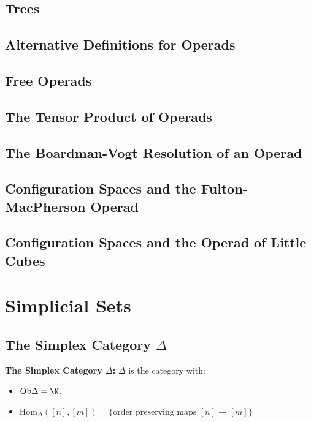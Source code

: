 \subsection{Trees}

\subsection{Alternative Definitions for Operads}

\subsection{Free Operads}

\subsection{The Tensor Product of Operads}

\subsection{The Boardman-Vogt Resolution of an Operad}

\subsection{Configuration Spaces and the Fulton-MacPherson Operad}

\subsection{Configuration Spaces and the Operad of Little Cubes}

\section{Simplicial Sets}
\subsection{The Simplex Category $\Delta$}
\begin{definition}
    \textbf{The Simplex Category $\Delta$: }$\Delta$ is the category with:
    \begin{itemize}
        \item $\text{Ob}\Delta = \N$,
        \item $\text{Hom}_{\Delta}([n], [m]) = \{\text{order preserving maps } [n]\to [m]\}$
    \end{itemize}
\end{definition}

